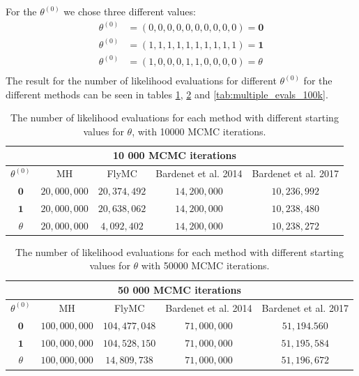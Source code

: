 For the $\theta^{\left(0\right)}$ we chose three different values: 
\begin{equation*}
\begin{split}
    \theta^{\left(0\right)} &= \left(0, 0, 0, 0, 0, 0, 0, 0, 0, 0\right) = \mathbf{0} \\
    \theta^{\left(0\right)} & = \left(1, 1, 1, 1, 1, 1, 1, 1, 1, 1 \right) = \mathbf{1} \\
    \theta^{\left(0\right)} & = \left(1, 0, 0, 0, 1, 1, 0, 0, 0, 0\right) = \theta \\
    \end{split}
\end{equation*}
The result for the number of likelihood evaluations for different $\theta^{\left(0\right)}$ for the different methods can be seen in tables \ref{tab:multiple_evals_10k}, \ref{tab:multiple_evals_50k} and \ref{tab:multiple_evals_100k}. 

\begin{table}[ht]
    \centering
\begin{tabular}{|c|c|c|c|c|}
  \hline
    \multicolumn{5}{|c|}{10 000 MCMC iterations} \\
    \hline
\hline

        $\theta^{\left(0\right)}$ &  MH & FlyMC & Bardenet et al. 2014 & Bardenet et al. 2017\\ 
         \hline \hline$\mathbf{0}$ & $20,000,000$ & $20,374,492$ & $14,200,000$ & $10,236,992$ \\
        $\mathbf{1}$ & $20,000,000$ & $20,638,062$ & $14,200,000$ & $10,238,480$ \\
        $\theta$ & $20,000,000$ & $4,092,402$ & $14,200,000$ & $10,238,272$
       
        \\ \hline
\end{tabular}
\caption{The number of likelihood evaluations for each method with different starting values for $\theta$, with 10000 MCMC iterations.}
\label{tab:multiple_evals_10k}
\end{table} 

 \begin{table}[ht]
    \centering
\begin{tabular}{|c|c|c|c|c|}
  \hline
    \multicolumn{5}{|c|}{50 000 MCMC iterations} \\
    \hline
\hline
        $\theta^{\left(0\right)}$ &  MH & FlyMC & Bardenet et al. 2014 & Bardenet et al. 2017\\ 
         \hline \hline$\mathbf{0}$ & $100,000,000$ & $104,477,048$ & $71,000,000$ & $51,194.560$ \\
        $\mathbf{1}$ & $100,000,000$ & $104,528,150$ & $71,000,000$ & $51,195,584$ \\
        $\theta$ & $100,000,000$ & $14,809,738$ & $71,000,000$ & $51,196,672$
        \\ \hline
\end{tabular}
\caption{The number of likelihood evaluations for each method with different starting values for $\theta$ with 50000 MCMC iterations.}
\label{tab:multiple_evals_50k}
\end{table} 

